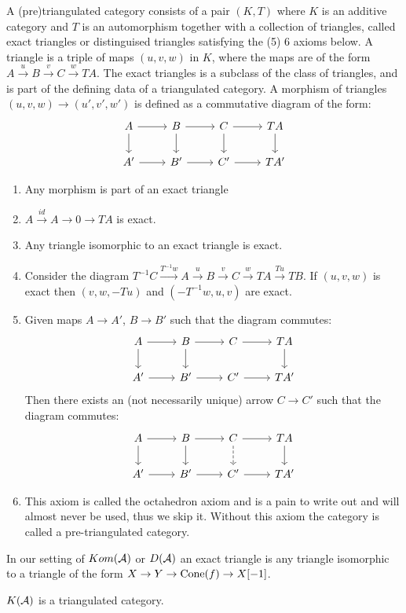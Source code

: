 \documentclass[a4paper, UKenglish]{report}
\begin{document}
A (pre)triangulated category consists of a pair $(K,T)$ where $K$ is an additive category and $T$ is an automorphism together with a collection of triangles, called exact triangles or distinguised triangles satisfying the  (5) 6 axioms below.
A triangle is a triple of maps $(u, v, w)$ in $K$, where the maps are of the form $A \xrightarrow{u} B \xrightarrow{v} C \xrightarrow{w} TA$. The exact triangles is a subclass of the class of triangles, and is part of the defining data of a triangulated category.
A morphism of triangles $(u, v, w) \to (u', v', w')$ is defined as a commutative diagram of the form:
\[
 \begin{tikzcd}
A \ar{d} \ar{r} & B \ar{d} \ar{r} & C \ar{d} \ar{r} & \ar{d} TA \\
A' \ar{r} & B' \ar{r} & C' \ar{r} & TA' 
\end{tikzcd} 
\]
\begin{enumerate}
\item Any morphism is part of an exact triangle
\item $A \xrightarrow{id} A \to 0 \to TA$ is exact.
\item Any triangle isomorphic to an exact triangle is exact.
\item Consider the diagram $T^{-1}C \xrightarrow{T^{-1}w} A \xrightarrow{u} B \xrightarrow{v} C \xrightarrow{w} TA \xrightarrow{Tu} TB$. If $(u,v,w)$ is exact then $(v,w,-Tu)$ and $(-T^{-1}w,u,v)$ are exact.
\item  Given maps $A \to A'$, $B \to B'$ such that the diagram commutes:
\[
\begin{tikzcd}
A \ar{d} \ar{r} & B \ar{d} \ar{r} & C  \ar{r} & \ar{d} TA \\
A' \ar{r} & B' \ar{r} & C' \ar{r} & TA' 
\end{tikzcd}
\]
Then there exists an (not necessarily unique) arrow $C \to C'$ such that the diagram commutes:
\[
\begin{tikzcd}
A \ar{d} \ar{r} & B \ar{d} \ar{r} & C \arrow[dashed]{d} \ar{r} & \ar{d} TA \\
A' \ar{r} & B' \ar{r} & C' \ar{r} & TA' 
\end{tikzcd} 
\]
\item This axiom is called the octahedron axiom and is a pain to write out and will almost never be used, thus we skip it. Without this axiom the category is called a pre-triangulated category.
\end{enumerate}

In our setting of $Kom(\mathcal{A})$ or $D(\mathcal{A})$ an exact triangle is any triangle isomorphic to a triangle of the form $X \to Y \to \operatorname{Cone}(f) \to X[-1]$.
\begin{proposition}
  $K(\mathcal{A})$ is a  triangulated category.
\end{proposition}
\end{document}
